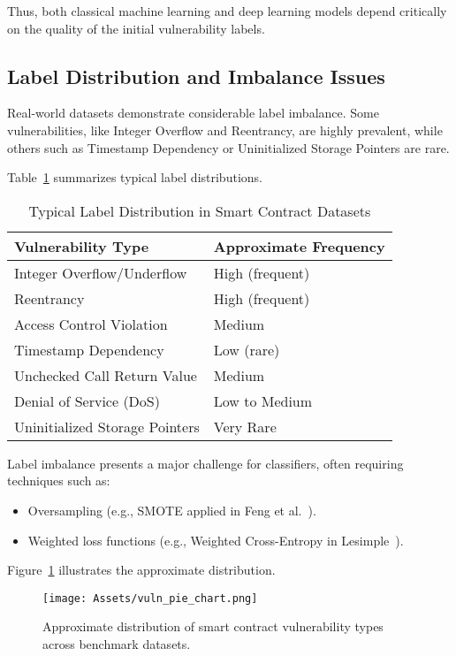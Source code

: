 Thus, both classical machine learning and deep learning models depend critically on the quality of the initial vulnerability labels.

\subsection{Label Distribution and Imbalance Issues}

Real-world datasets demonstrate considerable label imbalance. Some vulnerabilities, like Integer Overflow and Reentrancy, are highly prevalent, while others such as Timestamp Dependency or Uninitialized Storage Pointers are rare.

Table~\ref{tab:label_distribution} summarizes typical label distributions.

\begin{table}[H]
\centering
\small
\renewcommand{\arraystretch}{1.3}
\caption{Typical Label Distribution in Smart Contract Datasets}
\label{tab:label_distribution}
\begin{tabular}{|p{5cm}|p{3cm}|}
\hline
\textbf{Vulnerability Type} & \textbf{Approximate Frequency} \\
\hline
Integer Overflow/Underflow & High (frequent) \\
\hline
Reentrancy & High (frequent) \\
\hline
Access Control Violation & Medium \\
\hline
Timestamp Dependency & Low (rare) \\
\hline
Unchecked Call Return Value & Medium \\
\hline
Denial of Service (DoS) & Low to Medium \\
\hline
Uninitialized Storage Pointers & Very Rare \\
\hline
\end{tabular}
\end{table}

Label imbalance presents a major challenge for classifiers, often requiring techniques such as:

\begin{itemize}
    \item Oversampling (e.g., SMOTE applied in Feng et al.~\cite{feng2024interpretable}).
    \item Weighted loss functions (e.g., Weighted Cross-Entropy in Lesimple~\cite{lesimple2020master}).
\end{itemize}

Figure~\ref{fig:vulnerability_distribution_pie} illustrates the approximate distribution.
\begin{figure}[H]
    \centering
    \texttt{[image: Assets/vuln\_pie\_chart.png]}
    \caption{Approximate distribution of smart contract vulnerability types across benchmark datasets.}
    \label{fig:vulnerability_distribution_pie}
\end{figure}


